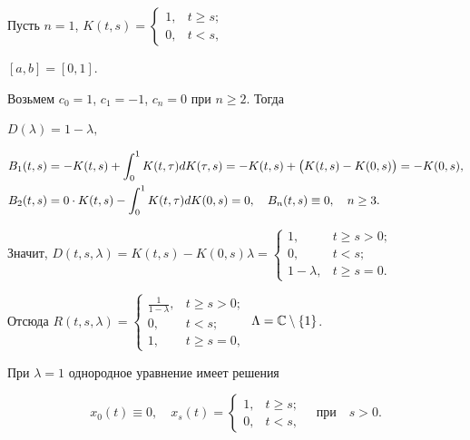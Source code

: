 \begin{exam} Пусть $n=1$, $K(t,s)=


\begin{cases} 1,& t\geq s;\\ 0,& t<s, \end{cases}$


$[a,b]=[0,1].$


Возьмем $c_0=1$, $c_1=-1$, $c_n=0$ при $n\geq 2.$ Тогда


$D(\lambda)=1-\lambda,$


\begin{align*}


B_1(t,s)&=-K(t,s)+\integral{0}{1}K(t,\tau)dK(\tau,s)=


-K(t,s)+\big(K(t,s)-K(0,s)\big)=-K(0,s), \\


%


B_2(t,s)&=0\cdot K(t,s)-\integral{0}{1}K(t,\tau)dK(0,s)=0,


\quad B_n(t,s)\equiv 0,\quad n\geq 3.


\end{align*}


Значит, $D(t,s,\lambda)=K(t,s)-K(0,s)\lambda=


\begin{cases} 1,& t\geq s>0;\\ 0,& t<s;\\ 1-\lambda,& t\geq s=0.


\end{cases}$


Отсюда $R(t,s,\lambda)=\begin{cases}


\frac{1}{1-\lambda},& t\geq s>0;\\ 0,& t<s;\\ 1,& t\geq s=0,


\end{cases}$ $\Lambda=\C\setminus\{1\}$.





При $\lambda=1$ однородное уравнение имеет решения


$$


x_0(t)\equiv 0,\quad x_s(t)=\begin{cases}


1,& t\geq s;\\ 0,& t<s, \end{cases}


\quad\text{при}\quad s>0.


$$


\end{exam}





